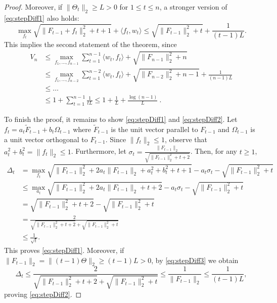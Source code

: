 \documentclass[english]{article}
\newcommand{\inpro}[2]{\langle #1, #2\rangle}
\begin{document}
\begin{proof}
Moreover, if $\|\Theta_t\|_2 \ge L>0$ for $1\le t\le n$, a stronger version of \eqref{eq:stepDiff1} also holds:
\begin{equation}
\label{eq:stepDiff2}
\max_{f_t} \sqrt{\|F_{t-1} + f_t\|_2^2 + t + 1} + \inpro{f_t}{w_t} \le  \sqrt{\|F_{t-1}\|_2^2 + t} + \frac{1}{(t-1)L}.
\end{equation}
This implies the second statement of the theorem, since
\begin{align*}
V_n & \le \max_{f_1,\ldots, f_{n-1}} \sum_{t=1}^{n-1}\inpro{w_t}{f_t} + \sqrt{\|F_{n-1}\|_2^2 + n} \\
& \le \max_{f_1,\ldots, f_{n-2}} \sum_{t=1}^{n-2}\inpro{w_t}{f_t}  + \sqrt{\|F_{n-2}\|_2^2 + n-1} + \frac{1}{(n-1)L} \\
& \le \ldots \\
& \le 1+ \sum_{t=1}^{n-1}\frac{1}{tL} \le 1+ \frac{1}{L} +\frac{\log(n-1)}{L}~.
\end{align*}

To finish the proof, it remains to show \eqref{eq:stepDiff1} and \eqref{eq:stepDiff2}.
Let  $f_t = a_t \tilde{F}_{t-1} + b_t \Omega_{t-1}$ where $\tilde{F}_{t-1}$ is the unit vector parallel to $F_{t-1}$ and $\Omega_{t-1}$ is a unit vector orthogonal to $F_{t-1}$. Since $\|f_t\|_2 \le 1$, observe that $a_t^2+b_t^2 =\|f_t\|_2 \le 1$. Furthermore, let $\sigma_t = \frac{\|F_{t-1}\|_2}{\sqrt{\|F_{t-1}\|_2^2 + t+2}}$.
Then, for any $t \ge 1$,
	\begin{align}
	\Delta_t & =\max_{f_t} \sqrt{\|F_{t-1}\|_2^2 + 2a_t\|F_{t-1}\|_2 + a_t^2 + b_t^2 + t+1} - a_t\sigma_t  - \sqrt{\|F_{t-1}\|_2^2 + t}  \nonumber\\
	& \le \max_{a_t} \sqrt{\|F_{t-1}\|_2^2 + 2a_t\|F_{t-1}\|_2 + t+2} - a_t\sigma_t  - \sqrt{\|F_{t-1}\|_2^2 + t}  \nonumber\\
	& = \sqrt{\|F_{t-1}\|_2^2 + t+2} - \sqrt{\|F_{t-1}\|_2^2 + t}  \nonumber\\
	& = \frac{2}{\sqrt{\|F_{t-1}\|_2^2 + t+2} + \sqrt{\|F_{t-1}\|_2^2 + t}} \label{eq:stepDiff3} \\
	& \le \frac{1}{\sqrt{t}}. \nonumber
	\end{align}
	This proves \eqref{eq:stepDiff1}.
	Moreover, if $\|F_{t-1}\|_2 = \|(t-1)\Theta\|_2 \ge (t-1)L>0$, by \eqref{eq:stepDiff3} we obtain
	\[
	\Delta_t \le \frac{2}{\sqrt{\|F_{t-1}\|_2^2 + t+2} + \sqrt{\|F_{t-1}\|_2^2 + t}} \le \frac{1}{\|F_{t-1}\|_2}\le \frac{1}{(t-1)L},
	\]
	proving \eqref{eq:stepDiff2}.
\end{proof}
\end{document}
